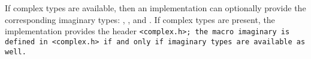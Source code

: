 If complex types are available, then an implementation
can optionally provide the corresponding imaginary types:
, , and .
If complex types are present, the implementation provides the header
\tt{<complex.h>}; the macro \tt{imaginary} is defined in \tt{<complex.h>}
if and only if imaginary types are available as well.
